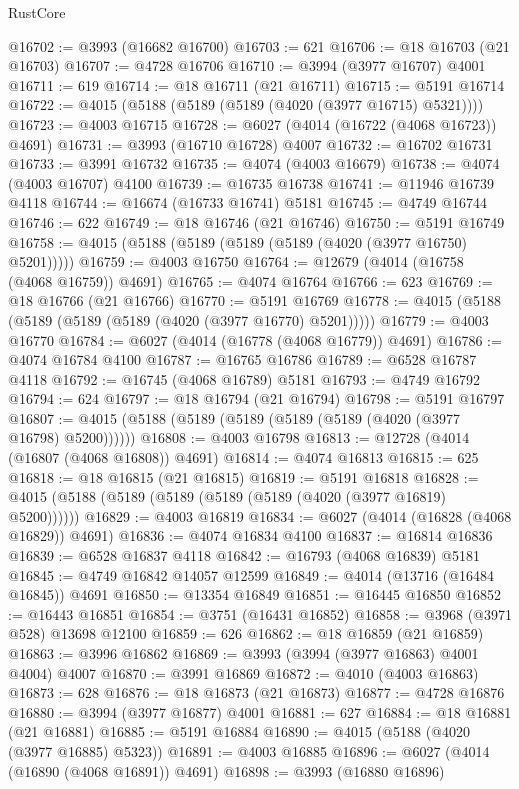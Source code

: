 \begin{lexlean}{RustCore}
\begin{coremodule}
@16702 := @3993 (@16682 @16700)
@16703 := 621
@16706 := @18 @16703 (@21 @16703)
@16707 := @4728 @16706
@16710 := @3994 (@3977 @16707) @4001
@16711 := 619
@16714 := @18 @16711 (@21 @16711)
@16715 := @5191 @16714
@16722 := @4015 (@5188 (@5189 (@5189 (@4020 (@3977 @16715) @5321))))
@16723 := @4003 @16715
@16728 := @6027 (@4014 (@16722 (@4068 @16723)) @4691)
@16731 := @3993 (@16710 @16728) @4007
@16732 := @16702 @16731
@16733 := @3991 @16732
@16735 := @4074 (@4003 @16679)
@16738 := @4074 (@4003 @16707) @4100
@16739 := @16735 @16738
@16741 := @11946 @16739 @4118
@16744 := @16674 (@16733 @16741) @5181
@16745 := @4749 @16744
@16746 := 622
@16749 := @18 @16746 (@21 @16746)
@16750 := @5191 @16749
@16758 := @4015 (@5188 (@5189 (@5189 (@5189 (@4020 (@3977 @16750) @5201)))))
@16759 := @4003 @16750
@16764 := @12679 (@4014 (@16758 (@4068 @16759)) @4691)
@16765 := @4074 @16764
@16766 := 623
@16769 := @18 @16766 (@21 @16766)
@16770 := @5191 @16769
@16778 := @4015 (@5188 (@5189 (@5189 (@5189 (@4020 (@3977 @16770) @5201)))))
@16779 := @4003 @16770
@16784 := @6027 (@4014 (@16778 (@4068 @16779)) @4691)
@16786 := @4074 @16784 @4100
@16787 := @16765 @16786
@16789 := @6528 @16787 @4118
@16792 := @16745 (@4068 @16789) @5181
@16793 := @4749 @16792
@16794 := 624
@16797 := @18 @16794 (@21 @16794)
@16798 := @5191 @16797
@16807 := @4015 (@5188 (@5189 (@5189 (@5189 (@5189 (@4020 (@3977 @16798) @5200))))))
@16808 := @4003 @16798
@16813 := @12728 (@4014 (@16807 (@4068 @16808)) @4691)
@16814 := @4074 @16813
@16815 := 625
@16818 := @18 @16815 (@21 @16815)
@16819 := @5191 @16818
@16828 := @4015 (@5188 (@5189 (@5189 (@5189 (@5189 (@4020 (@3977 @16819) @5200))))))
@16829 := @4003 @16819
@16834 := @6027 (@4014 (@16828 (@4068 @16829)) @4691)
@16836 := @4074 @16834 @4100
@16837 := @16814 @16836
@16839 := @6528 @16837 @4118
@16842 := @16793 (@4068 @16839) @5181
@16845 := @4749 @16842 @14057 @12599
@16849 := @4014 (@13716 (@16484 @16845)) @4691
@16850 := @13354 @16849
@16851 := @16445 @16850
@16852 := @16443 @16851
@16854 := @3751 (@16431 @16852)
@16858 := @3968 (@3971 @528) @13698 @12100
@16859 := 626
@16862 := @18 @16859 (@21 @16859)
@16863 := @3996 @16862
@16869 := @3993 (@3994 (@3977 @16863) @4001 @4004) @4007
@16870 := @3991 @16869
@16872 := @4010 (@4003 @16863)
@16873 := 628
@16876 := @18 @16873 (@21 @16873)
@16877 := @4728 @16876
@16880 := @3994 (@3977 @16877) @4001
@16881 := 627
@16884 := @18 @16881 (@21 @16881)
@16885 := @5191 @16884
@16890 := @4015 (@5188 (@4020 (@3977 @16885) @5323))
@16891 := @4003 @16885
@16896 := @6027 (@4014 (@16890 (@4068 @16891)) @4691)
@16898 := @3993 (@16880 @16896)

\end{coremodule}
\end{lexlean}

